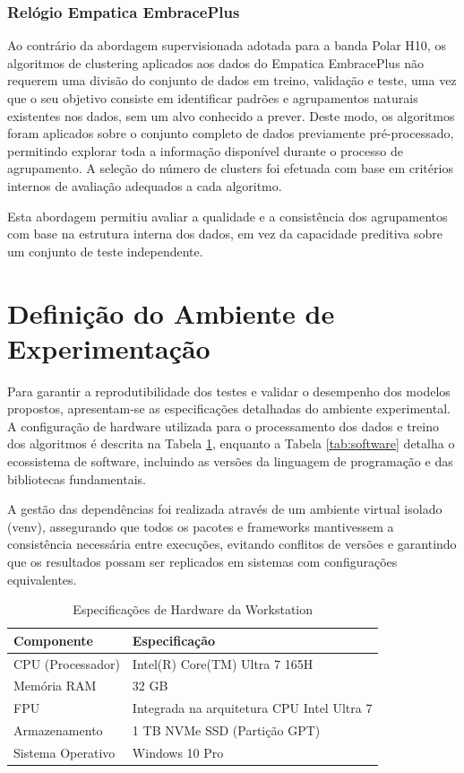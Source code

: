 \subsubsection*{Relógio Empatica EmbracePlus}

Ao contrário da abordagem supervisionada adotada para a banda Polar H10, os algoritmos de clustering aplicados aos dados do Empatica EmbracePlus não requerem uma divisão do conjunto de dados em treino, validação e teste, uma vez que o seu objetivo consiste em identificar padrões e agrupamentos naturais existentes nos dados, sem um alvo conhecido a prever. Deste modo, os algoritmos foram aplicados sobre o conjunto completo de dados previamente pré-processado, permitindo explorar toda a informação disponível durante o processo de agrupamento. A seleção do número de clusters foi efetuada com base em critérios internos de avaliação adequados a cada algoritmo.

Esta abordagem permitiu avaliar a qualidade e a consistência dos agrupamentos com base na estrutura interna dos dados, em vez da capacidade preditiva sobre um conjunto de teste independente.

\section{Definição do Ambiente de Experimentação}

Para garantir a reprodutibilidade dos testes e validar o desempenho dos modelos propostos, apresentam-se as especificações detalhadas do ambiente experimental. A configuração de hardware utilizada para o processamento dos dados e treino dos algoritmos é descrita na Tabela \ref{tab:hardware}, enquanto a Tabela \ref{tab:software} detalha o ecossistema de software, incluindo as versões da linguagem de programação e das bibliotecas fundamentais.

A gestão das dependências foi realizada através de um ambiente virtual isolado (venv), assegurando que todos os pacotes e frameworks mantivessem a consistência necessária entre execuções, evitando conflitos de versões e garantindo que os resultados possam ser replicados em sistemas com configurações equivalentes.

\begin{table}[H]
\centering
\caption{Especificações de Hardware da Workstation}
\label{tab:hardware}
\begin{tabular}{@{}ll@{}}
\toprule
Componente & Especificação \\
\midrule
CPU (Processador) & Intel(R) Core(TM) Ultra 7 165H \\
Memória RAM & 32 GB \\
FPU & Integrada na arquitetura CPU Intel Ultra 7 \\
Armazenamento & 1 TB NVMe SSD (Partição GPT) \\
Sistema Operativo & Windows 10 Pro \\
\bottomrule
\end{tabular}
\end{table}

